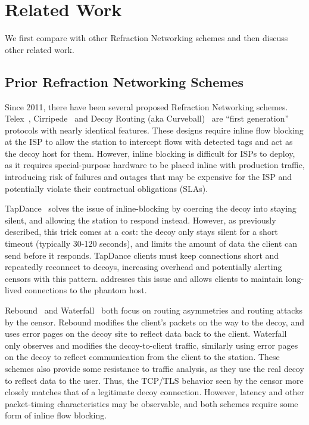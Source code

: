 \TabCompare

\section{Related Work}

We first compare \scheme with other Refraction Networking schemes and then discuss other related work.

\subsection{Prior Refraction Networking Schemes}

Since 2011, there have been several proposed Refraction Networking schemes.
Telex~\cite{telex11}, Cirripede~\cite{cirripede11} and Decoy
Routing (aka Curveball)~\cite{curveball11} are ``first generation'' protocols with nearly
identical features. These designs require inline flow blocking at the ISP to
allow the station to intercept flows with detected tags and act as the decoy
host for them. However, inline blocking is difficult for ISPs to deploy, as it
requires special-purpose hardware to be placed inline with production traffic,
introducing risk of failures and outages that may be expensive for the ISP
and potentially violate their contractual obligations (SLAs).

TapDance~\cite{tapdance14} solves the issue of inline-blocking by coercing the
decoy into staying silent, and allowing the station to respond instead. However,
as previously described, this trick comes at a cost: the decoy only stays silent
for a short timeout (typically 30-120 seconds), and limits the amount of data
the client can send before it responds. TapDance clients must keep connections
short and repeatedly reconnect to decoys, increasing overhead and potentially
alerting censors with this pattern. \scheme addresses this issue and allows
clients to maintain long-lived connections to the phantom host.

Rebound~\cite{rebound15} and Waterfall~\cite{waterfall17} both focus on routing
asymmetries and routing attacks by the censor. Rebound modifies the client's
packets on the way to the decoy, and uses error pages on the decoy site to
reflect data back to the client. Waterfall only observes and modifies the
decoy-to-client traffic, similarly using error pages on the decoy to reflect
communication from the client to the station. These schemes also provide some
resistance to traffic analysis, as they use the real decoy to reflect data to
the user. Thus, the TCP/TLS behavior seen by the censor more closely matches
that of a legitimate decoy connection. However, latency and other packet-timing
characteristics may be observable, and both schemes require some form of inline
flow blocking.

